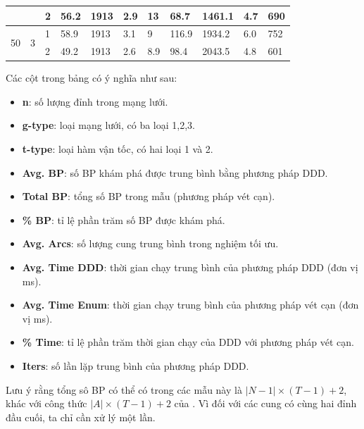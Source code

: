 \documentclass[../main.tex]{subfiles}
\begin{document}
\begin{table}[h]
{\begin{tabular}{|p{0.5cm}|p{1cm}|p{1cm}||p{1.5cm}|p{1.5cm}|p{1.3cm}||p{1.5cm}|p{2.5cm}|p{2.5cm}|p{1.3cm}|p{1.3cm}|}
                    &                    & 2     & 56.2            & 1913     & 2.9             & 13                & 68.7                  & 1461.1                 & 4.7          & 690        \\ \midrule
\multirow{2}{*}{50} & \multirow{2}{*}{3} & 1     & 58.9            & 1913     & 3.1             & 9                 & 116.9                 & 1934.2                 & 6.0          & 752        \\
                    &                    & 2     & 49.2            & 1913     & 2.6             & 8.9               & 98.4                  & 2043.5                 & 4.8          & 601         \\ \bottomrule
  \end{tabular}
  }
\end{table}

Các cột trong bảng có ý nghĩa như sau: 
\begin{itemize}
  \item \textbf{n}: số lượng đỉnh trong mạng lưới.
  \item \textbf{g-type}: loại mạng lưới, có ba loại 1,2,3.
  \item \textbf{t-type}: loại hàm vận tốc, có hai loại 1 và 2.
  \item \textbf{Avg. BP}: số BP khám phá được trung bình bằng phương pháp DDD.
  \item \textbf{Total BP}: tổng số BP trong mẫu (phương pháp vét cạn).
  \item \textbf{\% BP}: tỉ lệ phần trăm số BP được khám phá.
  \item \textbf{Avg. Arcs}: số lượng cung trung bình trong nghiệm tối ưu.
  \item \textbf{Avg. Time DDD}: thời gian chạy trung bình của phương pháp DDD (đơn vị ms).
  \item \textbf{Avg. Time Enum}: thời gian chạy trung bình của phương pháp vét cạn (đơn vị ms).
  \item \textbf{\% Time}: tỉ lệ phần trăm thời gian chạy của DDD với phương pháp vét cạn.
  \item \textbf{Iters}: số lần lặp trung bình của phương pháp DDD.
\end{itemize}

Lưu ý rằng tổng sô BP có thể có trong các mẫu này là
\(|N − 1| \times (T − 1) + 2\), khác với công thức
\(|A| \times (T − 1) + 2\) của \cite{foschini2011complexity}. Vì đối
với các cung có cùng hai đỉnh đầu cuối, ta chỉ cần xử lý một lần.
\end{document}
